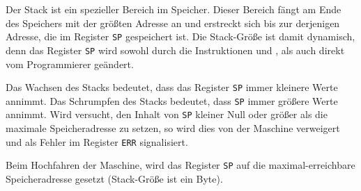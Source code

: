 Der Stack ist ein spezieller Bereich im Speicher. Dieser Bereich fängt am Ende
des Speichers mit der größten Adresse an und erstreckt sich bis zur derjenigen
Adresse, die im Register \texttt{SP} gespeichert ist. Die Stack-Größe ist damit
dynamisch, denn das Register \texttt{SP} wird sowohl durch die Instruktionen
 und , als auch direkt vom Programmierer geändert.

Das Wachsen des Stacks bedeutet, dass das Register
\texttt{SP} immer kleinere Werte annimmt. Das Schrumpfen
des Stacks bedeutet, dass \texttt{SP} immer größere Werte annimmt. Wird
versucht, den Inhalt von \texttt{SP} kleiner Null oder größer als die maximale
Speicheradresse zu setzen, so wird dies von der Maschine verweigert und als
Fehler im Register \texttt{ERR} signalisiert.

Beim Hochfahren der Maschine, wird das Register \texttt{SP} auf die
maximal-erreichbare Speicheradresse gesetzt (Stack-Größe ist ein Byte).


